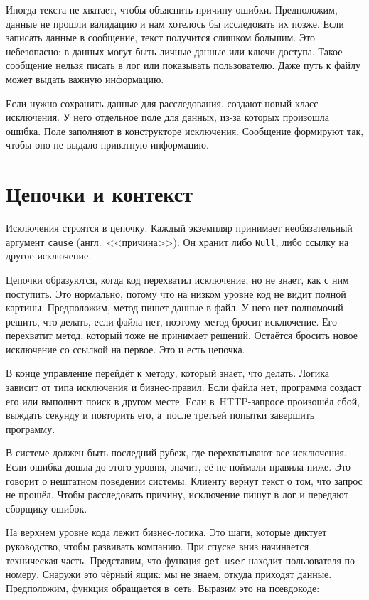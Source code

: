 
Иногда текста не хватает, чтобы объяснить причину ошибки. Предположим, данные не
прошли валидацию и нам хотелось бы исследовать их позже. Если записать данные в
сообщение, текст получится слишком большим. Это небезопасно: в данных могут быть
личные данные или ключи доступа. Такое сообщение нельзя писать в лог или
показывать пользователю. Даже путь к файлу может выдать важную информацию.

Если нужно сохранить данные для расследования, создают новый класс исключения. У
него отдельное поле для данных, из-за которых произошла ошибка. Поле заполняют в
конструкторе исключения. Сообщение формируют так, чтобы оно не выдало приватную
информацию.

\section{Цепочки и контекст}


Исключения строятся в цепочку. Каждый экземпляр принимает необязательный
аргумент \verb|cause| (англ.~<<причина>>). Он хранит либо \verb|Null|, либо
ссылку на другое исключение.



Цепочки образуются, когда код перехватил исключение, но не знает, как с ним
поступить.  Это нормально, потому что на низком уровне код не видит полной
картины. Предположим, метод пишет данные в файл. У него нет полномочий решить,
что делать, если файла нет, поэтому метод бросит исключение. Его перехватит
метод, который тоже не принимает решений. Остаётся бросить новое исключение
со ссылкой на первое. Это и есть цепочка.

В конце управление перейдёт к методу, который знает, что делать. Логика зависит
от типа исключения и бизнес-правил. Если файла нет, программа создаст его или
выполнит поиск в другом месте. Если в~HTTP-запросе произошёл сбой, выждать
секунду и повторить его, а~после третьей попытки завершить программу.

В системе должен быть последний рубеж, где перехватывают все исключения. Если
ошибка дошла до этого уровня, значит, её не поймали правила ниже. Это говорит о
нештатном поведении системы. Клиенту вернут текст о том, что запрос не
прошёл. Чтобы расследовать причину, исключение пишут в лог и передают сборщику
ошибок.

На верхнем уровне кода лежит бизнес-логика. Это шаги, которые диктует
руководство, чтобы развивать компанию. При спуске вниз начинается техническая
часть. Представим, что функция \verb|get-user| находит пользователя по
номеру. Снаружи это чёрный ящик: мы не знаем, откуда приходят
данные. Предположим, функция обращается в~сеть. Выразим это на псевдокоде:

